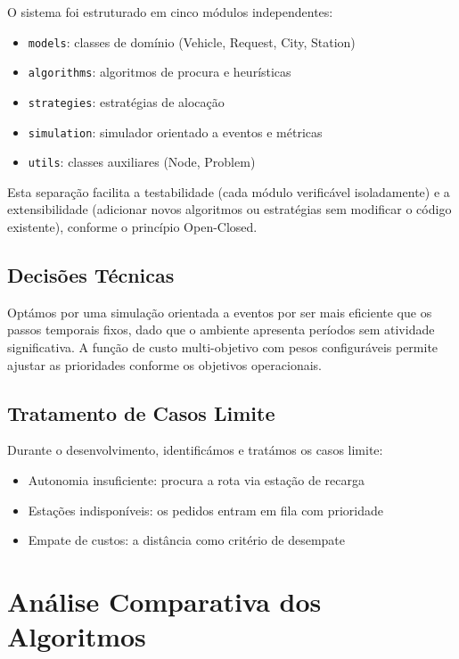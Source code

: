 \documentclass[11pt,a4paper]{article}
\begin{document}
O sistema foi estruturado em cinco módulos independentes:
\begin{itemize}
    \item \texttt{models}: classes de domínio (Vehicle, Request, City, Station)
    \item \texttt{algorithms}: algoritmos de procura e heurísticas
    \item \texttt{strategies}: estratégias de alocação
    \item \texttt{simulation}: simulador orientado a eventos e métricas
    \item \texttt{utils}: classes auxiliares (Node, Problem)
\end{itemize}

Esta separação facilita a testabilidade (cada módulo verificável isoladamente) e a extensibilidade (adicionar novos algoritmos ou estratégias sem modificar o código existente), conforme o princípio Open-Closed.

\subsection{Decisões Técnicas}

Optámos por uma simulação orientada a eventos por ser mais eficiente que os passos temporais fixos, dado que o ambiente apresenta períodos sem atividade significativa. A função de custo multi-objetivo com pesos configuráveis permite ajustar as prioridades conforme os objetivos operacionais.

\subsection{Tratamento de Casos Limite}

Durante o desenvolvimento, identificámos e tratámos os casos limite:
\begin{itemize}
    \item Autonomia insuficiente: procura a rota via estação de recarga
    \item Estações indisponíveis: os pedidos entram em fila com prioridade
    \item Empate de custos: a distância como critério de desempate
\end{itemize}

\section{Análise Comparativa dos Algoritmos}
\end{document}
